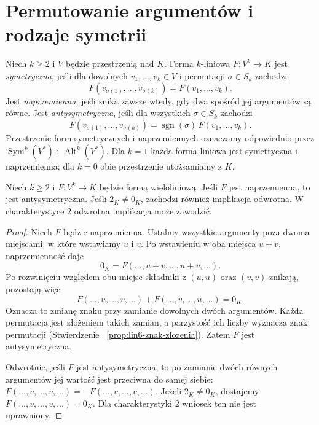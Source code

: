 \section{Permutowanie argumentów i rodzaje symetrii}
\label{sec:lin8-symetrie}

\begin{definicja}
\label{def:lin8-formy-sym-alt}
Niech \(k\geq2\) i
\(V\) będzie przestrzenią nad \(K\).
Forma \(k\)-liniowa
\(F\colon V^k\to K\)
jest \emph{symetryczna}, jeśli
dla dowolnych \(v_1,\ldots,v_k\in V\)
i permutacji \(\sigma\in S_k\)
zachodzi
\[
 F(v_{\sigma(1)},\ldots,v_{\sigma(k)})
 =F(v_1,\ldots,v_k).
\]
Jest \emph{naprzemienna}, jeśli
znika zawsze wtedy, gdy dwa spośród
jej argumentów są równe.
Jest \emph{antysymetryczna}, jeśli
dla wszystkich \(\sigma\in S_k\)
zachodzi
\[
 F(v_{\sigma(1)},\ldots,v_{\sigma(k)})
 =\operatorname{sgn}(\sigma)\,
  F(v_1,\ldots,v_k).
\]
Przestrzenie form symetrycznych
i naprzemiennych oznaczamy odpowiednio
przez \(\operatorname{Sym}^k(V^*)\)
i \(\operatorname{Alt}^k(V^*)\).
Dla \(k=1\) każda forma liniowa
jest symetryczna i naprzemienna;
dla \(k=0\) obie przestrzenie
utożsamiamy z \(K\).
\end{definicja}

\begin{twierdzenie}
\label{thm:lin8-alt-antysym}
Niech \(k\geq2\) i
\(F\colon V^k\to K\)
będzie formą wieloliniową.
Jeśli \(F\) jest naprzemienna,
to jest antysymetryczna.
Jeśli \(2_K\ne0_K\), zachodzi
również implikacja odwrotna.
W charakterystyce \(2\)
odwrotna implikacja może zawodzić.
\end{twierdzenie}
\begin{proof}
Niech \(F\) będzie naprzemienna.
Ustalmy wszystkie argumenty
poza dwoma miejscami, w które
wstawiamy \(u\) i \(v\).
Po wstawieniu w oba miejsca
\(u+v\), naprzemienność daje
\[
 0_K=F(\ldots,u+v,\ldots,u+v,\ldots).
\]
Po rozwinięciu względem obu miejsc
składniki z \((u,u)\) oraz \((v,v)\)
znikają, pozostają więc
\[
 F(\ldots,u,\ldots,v,\ldots)
 +F(\ldots,v,\ldots,u,\ldots)=0_K.
\]
Oznacza to zmianę znaku
przy zamianie dowolnych
dwóch argumentów.
Każda permutacja jest złożeniem
takich zamian, a parzystość
ich liczby wyznacza znak
permutacji (Stwierdzenie~
\ref{prop:lin6-znak-zlozenia}).
Zatem \(F\) jest antysymetryczna.

Odwrotnie, jeśli \(F\)
jest antysymetryczna, to po
zamianie dwóch równych argumentów
jej wartość jest przeciwna
do samej siebie:
\(F(\ldots,v,\ldots,v,\ldots)
=-F(\ldots,v,\ldots,v,\ldots)\).
Jeżeli \(2_K\ne0_K\), dostajemy
\(F(\ldots,v,\ldots,v,\ldots)=0_K\).
Dla charakterystyki \(2\)
wniosek ten nie jest uprawniony.
\end{proof}

